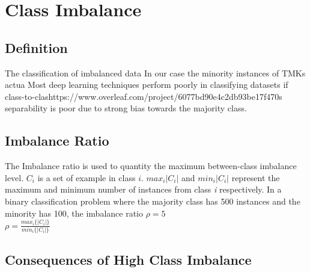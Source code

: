 \section{Class Imbalance}
\subsection{Definition}
The classification of imbalanced data
In our case the minority instances of TMKs actua
Most deep learning techniques perform poorly in classifying datasets if class-to-clashttps://www.overleaf.com/project/6077bd90e4c2db93be17f470s separability is poor due to strong bias towards the majority class.


\subsection{Imbalance Ratio}
The Imbalance ratio is used to quantity the maximum between-class imbalance level. $C_i$ is a set of example in class $i$. $max_i{|C_i|}$ and $min_i{|C_i|}$ represent the maximum and minimum number of instances from class \emph{i} respectively. In a binary classification problem where the majority class has 500 instances and the minority has 100, the imbalance ratio $\rho = 5$\\

$\rho = \frac{max_i\{|C_i|\}}{min_i\{|C_i|\}}$

\subsection{Consequences of High Class Imbalance}